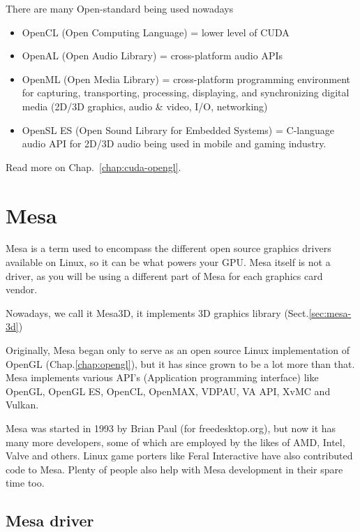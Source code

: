 There are many Open-standard being used nowadays
\begin{itemize}
\item OpenCL (Open Computing Language) = lower level of CUDA
\item OpenAL (Open Audio Library) = cross-platform audio APIs
\item OpenML (Open Media Library) = cross-platform programming
  environment for capturing, transporting, processing, displaying, and
  synchronizing digital media (2D/3D graphics, audio \& video, I/O,
  networking) 
\item OpenSL ES (Open Sound Library for Embedded Systems) = C-language
  audio API for 2D/3D audio being used in mobile and gaming industry. 
\end{itemize}

Read more on Chap.~\ref{chap:cuda-opengl}. 

\chapter{Mesa}
\label{chap:mesa}
\label{sec:mesa}


Mesa is a term used to encompass the different open source graphics drivers
available on Linux, so it can be what powers your GPU. 
Mesa itself is not a driver, as you will be using a different part of Mesa for
each graphics card vendor.  

Nowadays, we call it Mesa3D, it implements 3D graphics library
(Sect.\ref{sec:mesa-3d})

Originally, Mesa began only to serve as an open source Linux implementation of
OpenGL (Chap.\ref{chap:opengl}), but it has since grown to be a lot more than
that. Mesa implements various API's (Application programming interface) like
OpenGL, OpenGL ES, OpenCL, OpenMAX, VDPAU, VA API, XvMC and Vulkan.


Mesa was started in 1993 by Brian Paul (for freedesktop.org), but now it has
many more developers, some of which are employed by the likes of AMD, Intel,
Valve and others.
Linux game porters like Feral Interactive have also contributed code to Mesa.
Plenty of people also help with Mesa development in their spare time too.

\section{Mesa driver}

